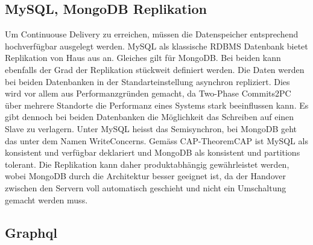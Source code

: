 \subsection{MySQL, MongoDB Replikation}

Um Continuouse Delivery zu erreichen, müssen die Datenspeicher entsprechend hochverfügbar ausgelegt werden. MySQL als klassische \Gls{RDBMS} Datenbank bietet Replikation von Haus aus an. Gleiches gilt für MongoDB. Bei beiden kann ebenfalls der Grad der Replikation stückweit definiert werden. Die Daten werden bei beiden Datenbanken in der Standarteinstellung asynchron repliziert. Dies wird vor allem aus Performanzgründen gemacht, da Two-Phase Commits\Gls{2PC} über mehrere Standorte die Performanz eines Systems stark beeinflussen kann. Es gibt dennoch bei beiden Datenbanken die Möglichkeit das Schreiben auf einen Slave zu verlagern. Unter MySQL heisst das Semisynchron, bei MongoDB geht das unter dem Namen WriteConcerns. Gemäss CAP-Theorem\Gls{CAP} ist MySQL als konsistent und verfügbar deklariert und MongoDB als konsistent und partitions tolerant. Die Replikation kann daher produktabhängig gewährleistet werden, wobei MongoDB durch die Architektur besser geeignet ist, da der Handover zwischen den Servern voll automatisch geschieht und nicht ein Umschaltung gemacht werden muss.

\subsection{Graphql}

